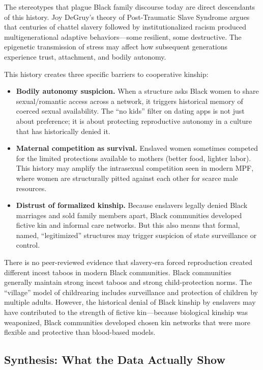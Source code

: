 The stereotypes that plague Black family discourse today are direct descendants of this history. Joy DeGruy's theory of Post-Traumatic Slave Syndrome argues that centuries of chattel slavery followed by institutionalized racism produced multigenerational adaptive behaviors---some resilient, some destructive. The epigenetic transmission of stress may affect how subsequent generations experience trust, attachment, and bodily autonomy.

This history creates three specific barriers to cooperative kinship:

\begin{itemize}
  \item \textbf{Bodily autonomy suspicion.} When a structure asks Black women to share sexual/romantic access across a network, it triggers historical memory of coerced sexual availability. The ``no kids'' filter on dating apps is not just about preference; it is about protecting reproductive autonomy in a culture that has historically denied it.
  
  \item \textbf{Maternal competition as survival.} Enslaved women sometimes competed for the limited protections available to mothers (better food, lighter labor). This history may amplify the intrasexual competition seen in modern MPF, where women are structurally pitted against each other for scarce male resources.
  
  \item \textbf{Distrust of formalized kinship.} Because enslavers legally denied Black marriages and sold family members apart, Black communities developed fictive kin and informal care networks. But this also means that formal, named, ``legitimized'' structures may trigger suspicion of state surveillance or control.
\end{itemize}

There is no peer-reviewed evidence that slavery-era forced reproduction created different incest taboos in modern Black communities. Black communities generally maintain strong incest taboos and strong child-protection norms. The ``village'' model of childrearing includes surveillance and protection of children by multiple adults. However, the historical denial of Black kinship by enslavers may have contributed to the strength of fictive kin---because biological kinship was weaponized, Black communities developed chosen kin networks that were more flexible and protective than blood-based models.

\subsection{Synthesis: What the Data Actually Show}

